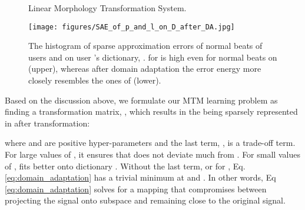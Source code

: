 \documentclass[journal,transmag]{IEEEtran}
\begin{document}
\begin{figure}[H]

\caption{Linear Morphology Transformation System.}
\label{fig:linear_transformation_system}

\end{figure} 
\begin{figure}[!htbp]
    \captionsetup{font=footnotesize}
    \centering
    \texttt{[image: figures/SAE\_of\_p\_and\_l\_on\_D\_after\_DA.jpg]}
    \caption{The histogram of sparse approximation errors of normal beats of users  and  on user 's dictionary, .  for  is high even for normal beats on  (upper), whereas after domain adaptation the error energy more closely resembles the ones of  (lower).}
    \label{fig:SAE_of_p_and_l_on_D_after_DA}
\end{figure}

Based on the discussion above, we formulate our MTM learning problem as finding a transformation matrix, , which results in the  being sparsely represented in  after transformation: 

where  and  are positive hyper-parameters and the last term, , is a trade-off term. For large values of , it ensures that  does not deviate much from . For small values of ,  fits better onto dictionary . Without the last term, or for , Eq. \eqref{eq:domain_adaptation} has a trivial minimum at  and . In other words, Eq \eqref{eq:domain_adaptation} solves for a mapping that compromises between projecting the signal onto subspace  and remaining close to the original signal.
\end{document}

